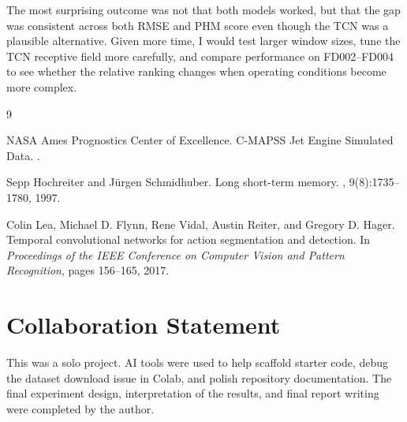\documentclass{article}
\begin{document}
The most surprising outcome was not that both models worked, but that the gap was consistent across both RMSE and PHM score even though the TCN was a plausible alternative. Given more time, I would test larger window sizes, tune the TCN receptive field more carefully, and compare performance on FD002--FD004 to see whether the relative ranking changes when operating conditions become more complex.

\begin{thebibliography}{9}

NASA Ames Prognostics Center of Excellence.
\newblock C-MAPSS Jet Engine Simulated Data.
.

Sepp Hochreiter and J{\"u}rgen Schmidhuber.
\newblock Long short-term memory.
, 9(8):1735--1780, 1997.

Colin Lea, Michael D. Flynn, Rene Vidal, Austin Reiter, and Gregory D. Hager.
\newblock Temporal convolutional networks for action segmentation and detection.
\newblock In {\em Proceedings of the IEEE Conference on Computer Vision and Pattern Recognition}, pages 156--165, 2017.

\end{thebibliography}

\clearpage
\section*{Collaboration Statement}

This was a solo project. AI tools were used to help scaffold starter code, debug the dataset download issue in Colab, and polish repository documentation. The final experiment design, interpretation of the results, and final report writing were completed by the author.
\end{document}
